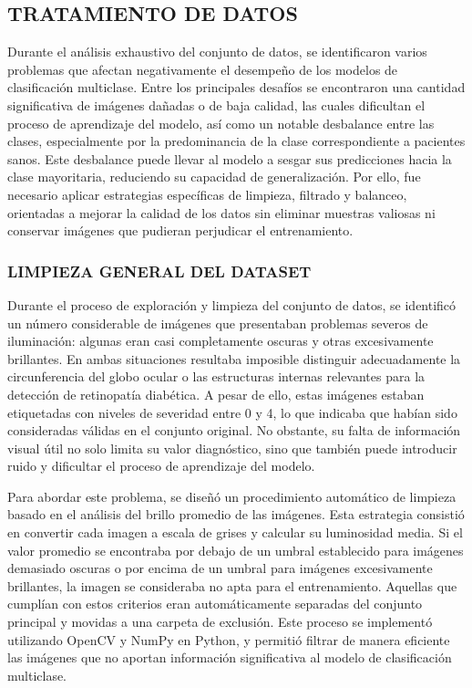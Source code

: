 \subsection{TRATAMIENTO DE DATOS}

Durante el análisis exhaustivo del conjunto de datos, se identificaron varios problemas
que afectan negativamente el desempeño de los modelos de clasificación multiclase. Entre
los principales desafíos se encontraron una cantidad significativa de imágenes dañadas o
de baja calidad, las cuales dificultan el proceso de aprendizaje del modelo, así como un
notable desbalance entre las clases, especialmente por la predominancia de la clase
correspondiente a pacientes sanos. Este desbalance puede llevar al modelo a sesgar sus
predicciones hacia la clase mayoritaria, reduciendo su capacidad de generalización. Por
ello, fue necesario aplicar estrategias específicas de limpieza, filtrado y balanceo,
orientadas a mejorar la calidad de los datos sin eliminar muestras valiosas ni conservar
imágenes que pudieran perjudicar el entrenamiento.

\subsubsection{LIMPIEZA GENERAL DEL DATASET}

Durante el proceso de exploración y limpieza del conjunto de datos, se identificó un
número considerable de imágenes que presentaban problemas severos de iluminación: algunas
eran casi completamente oscuras y otras excesivamente brillantes. En ambas situaciones
resultaba imposible distinguir adecuadamente la circunferencia del globo ocular o las
estructuras internas relevantes para la detección de retinopatía diabética. A pesar de
ello, estas imágenes estaban etiquetadas con niveles de severidad entre 0 y 4, lo que
indicaba que habían sido consideradas válidas en el conjunto original. No obstante, su
falta de información visual útil no solo limita su valor diagnóstico, sino que también
puede introducir ruido y dificultar el proceso de aprendizaje del modelo.

Para abordar este problema, se diseñó un procedimiento automático de limpieza basado en el
análisis del brillo promedio de las imágenes. Esta estrategia consistió en convertir cada
imagen a escala de grises y calcular su luminosidad media. Si el valor promedio se
encontraba por debajo de un umbral establecido para imágenes demasiado oscuras o por
encima de un umbral para imágenes excesivamente brillantes, la imagen se consideraba no
apta para el entrenamiento. Aquellas que cumplían con estos criterios eran automáticamente
separadas del conjunto principal y movidas a una carpeta de exclusión. Este proceso se
implementó utilizando OpenCV y NumPy en Python, y permitió filtrar de manera eficiente las
imágenes que no aportan información significativa al modelo de clasificación multiclase.

